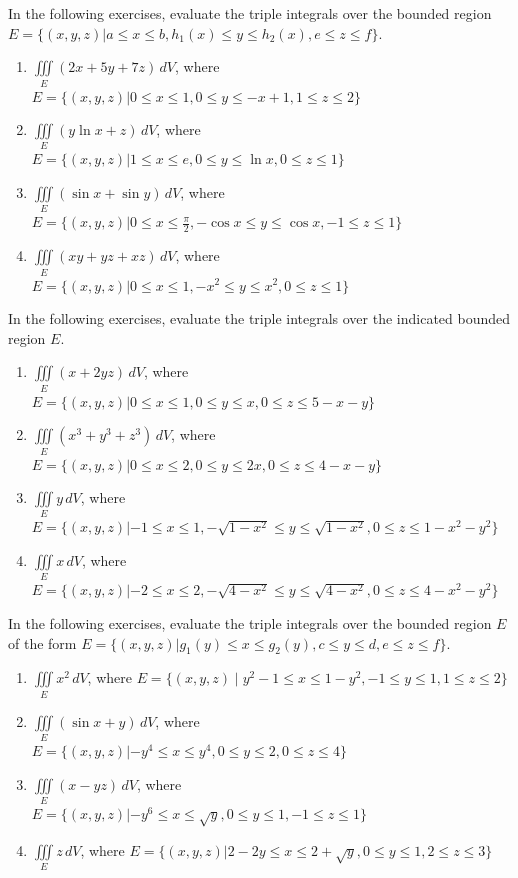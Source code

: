 \documentclass{exercises}
\begin{document}
In the following exercises, evaluate the triple integrals over the bounded region $E=\{(x,y,z)|a\le x\le b,h_{1}(x)\le y\le h_{2}(x),e\le z\le f\}$.

\begin{enumerate}[resume]
\item $\underset{E}{\iiint}(2x+5y+7z)\,dV$, where $E=\{(x,y,z)|0\le x\le1,0\le y\le-x+1,1\le z\le2\}$
\item $\underset{E}{\iiint}(y\ln x+z)\,dV$, where $E=\{(x,y,z)|1\le x\le e,0\le y\le \ln x,0\le z\le1\}$
\item $\underset{E}{\iiint}(\sin x+\sin y)\,dV$, where $E=\{(x,y,z)|0\le x\le \frac{\pi}{2},-\cos x\le y\le \cos x,-1\le z\le1\}$
\item $\underset{E}{\iiint}(xy+yz+xz)\,dV$, where $E=\{(x,y,z)|0\le x\le1,-x^{2}\le y\le x^{2},0\le z\le1\}$
\end{enumerate}

In the following exercises, evaluate the triple integrals over the indicated bounded region $E$.

\begin{enumerate}[resume]
\item $\underset{E}{\iiint}(x+2yz)\,dV$, where $E=\{(x,y,z)|0\le x\le1,0\le y\le x,0\le z\le5-x-y\}$
\item $\underset{E}{\iiint}(x^{3}+y^{3}+z^{3})\,dV$, where $E=\{(x,y,z)|0\le x\le2,0\le y\le2x,0\le z\le4-x-y\}$
\item $\underset{E}{\iiint}y\,dV$, where $E=\{(x,y,z)|-1\le x\le1,-\sqrt{1-x^{2}}\le y\le \sqrt{1-x^{2}},0\le z\le1-x^{2}-y^{2}\}$
\item $\underset{E}{\iiint}x\,dV$, where $E=\{(x,y,z)|-2\le x\le2,-\sqrt{4-x^{2}}\le y\le \sqrt{4-x^{2}},0\le z\le4-x^{2}-y^{2}\}$
\end{enumerate}

In the following exercises, evaluate the triple integrals over the bounded region $E$ of the form $E=\{(x,y,z)|g_{1}(y)\le x\le g_{2}(y),c\le y\le d,e\le z\le f\}$.

\begin{enumerate}[resume]
\item $\underset{E}{\iiint}x^{2}\,dV$, where $E=\{(x,y,z)\mid y^{2}-1\le x\le1-y^{2},-1\le y\le1,1\le z\le2\}$
\item $\underset{E}{\iiint}(\sin x+y)\,dV$, where $E=\{(x,y,z)|-y^{4}\le x\le y^{4},0\le y\le2,0\le z\le4\}$
\item $\underset{E}{\iiint}(x-yz)\,dV$, where $E=\{(x,y,z)|-y^{6}\le x\le \sqrt{y},0\le y\le1,-1\le z\le1\}$
\item $\underset{E}{\iiint}z\,dV$, where $E=\{(x,y,z)|2-2y\le x\le2+\sqrt{y},0\le y\le1,2\le z\le3\}$
\end{enumerate}
\end{document}

